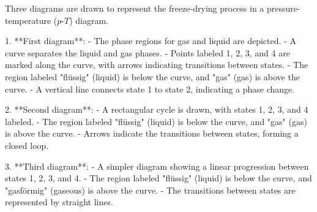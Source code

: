 Three diagrams are drawn to represent the freeze-drying process in a pressure-temperature (\(p\)-\(T\)) diagram.  

1. **First diagram**:  
   - The phase regions for gas and liquid are depicted.  
   - A curve separates the liquid and gas phases.  
   - Points labeled 1, 2, 3, and 4 are marked along the curve, with arrows indicating transitions between states.  
   - The region labeled "flüssig" (liquid) is below the curve, and "gas" (gas) is above the curve.  
   - A vertical line connects state 1 to state 2, indicating a phase change.  

2. **Second diagram**:  
   - A rectangular cycle is drawn, with states 1, 2, 3, and 4 labeled.  
   - The region labeled "flüssig" (liquid) is below the curve, and "gas" (gas) is above the curve.  
   - Arrows indicate the transitions between states, forming a closed loop.  

3. **Third diagram**:  
   - A simpler diagram showing a linear progression between states 1, 2, 3, and 4.  
   - The region labeled "flüssig" (liquid) is below the curve, and "gasförmig" (gaseous) is above the curve.  
   - The transitions between states are represented by straight lines.